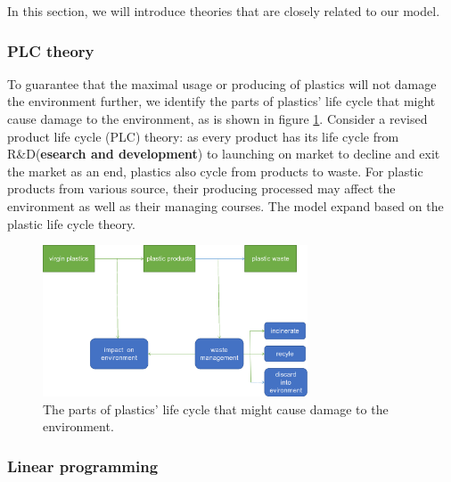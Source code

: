 \documentclass{mcmthesis}
\begin{document}
In this section, we will introduce theories that are closely related to our model.


\subsubsection{PLC theory}

To guarantee that the maximal usage or producing of plastics will not damage the environment further, we identify the parts of plastics’ life cycle that might cause damage to the environment, as is shown in figure \ref{fig4}. Consider a revised product life cycle (PLC) theory: as every product has its life cycle from R\&D(\textbf{esearch and development}) to launching on market to decline and exit the market as an end, plastics also cycle from products to waste. For plastic products from various source, their producing processed may affect the environment as well as their managing courses. The model expand based on the plastic life cycle theory. 

\begin{figure}[!htb] %
	\centering %
	\includegraphics[width=0.7\textwidth]{figures/PCL.png} %
	\caption{The parts of plastics’ life cycle that might cause damage to the environment.} %
	\label{fig4} %
	
\end{figure}

\subsubsection{Linear programming}
\end{document}
